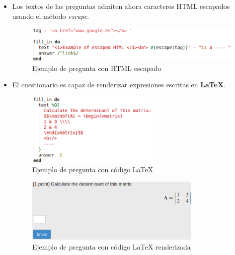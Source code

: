 \begin{itemize}
  \item Los textos de las preguntas admiten ahora caracteres HTML escapados usando el m\'etodo \textit{escape}.
  \begin{figure}[!th]
  \begin{center}
  \includegraphics[width=1\textwidth]{images/tag.eps}
  \caption{Ejemplo de pregunta con HTML escapado}
  \label{fig:tag}
  \end{center}
  \end{figure}
  \newpage
  
  \item El cuestionario es capaz de renderizar expresiones escritas en {\bfseries LaTeX}.
  \begin{figure}[H]
  \begin{center}
  \includegraphics[width=0.6\textwidth]{images/latex.eps}
  \caption{Ejemplo de pregunta con c\'odigo LaTeX}
  \label{fig:latex}
  \end{center}
  \end{figure}
  
  \begin{figure}[H]
  \begin{center}
  \includegraphics[width=0.8\textwidth]{images/latex2.eps}
  \caption{Ejemplo de pregunta con c\'odigo LaTeX renderizada}
  \label{fig:latex2}
  \end{center}
  \end{figure}
  \newpage
  

\end{itemize}
